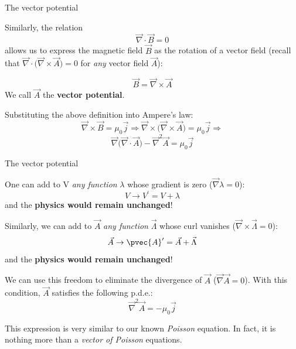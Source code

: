 %
%
%

\begin{frame}{The vector potential}

Similarly, the relation
\begin{equation*}
      \vec{\nabla} \cdot \vec{B} = 0
\end{equation*}
allows us to express the magnetic field $\vec{B}$ as the rotation of a
vector field (recall that $\vec{\nabla} \cdot \Big( \vec{\nabla} \times \vec{A} \Big) =0$
for {\em any} vector field $\vec{A}$):

\begin{equation*}
      \vec{B} = \vec{\nabla} \times \vec{A}
\end{equation*}
We call $\vec{A}$ the {\bf vector potential}.

\vspace{0.2cm}

Substituting the above definition into Ampere's law:
\begin{equation*}
     \vec{\nabla} \times \vec{B} = \mu_{0} \vec{j} \Rightarrow
     \vec{\nabla} \times \Big( \vec{\nabla} \times \vec{A}  \Big) =  \mu_{0} \vec{j} \Rightarrow
\end{equation*}
\begin{equation*}
     \vec{\nabla} \Big( \vec{\nabla} \cdot \vec{A}  \Big) - \vec{\nabla}^2 \vec{A}   =  \mu_{0} \vec{j}
\end{equation*}

\end{frame}

%
%
%

\begin{frame}{The vector potential}

One can add to V {\em any function} $\lambda$ whose gradient is zero ($\vec{\nabla} \lambda = 0$):
\begin{equation*}
   V \rightarrow V^{\prime} = V + \lambda
\end{equation*}
and the {\bf physics would remain unchanged}!\\
\vspace{0.1cm}

Similarly, we can add to $\vec{A}$  {\em any function} $\vec{\Lambda}$
whose curl vanishes ($\vec{\nabla} \times \vec{\Lambda} = 0$):
\begin{equation*}
   \vec{A} \rightarrow \pvec{A}' = \vec{A} + \vec{\Lambda}
\end{equation*}
and the {\bf physics would remain unchanged}!\\
\vspace{0.1cm}

We can use this freedom to eliminate the divergence of $\vec{A}$ ($\vec{\nabla} \vec{A} = 0$).
With this condition, $\vec{A}$ satisfies the following p.d.e.:
\begin{equation*}
   \vec{\nabla}^2 \vec{A}   =  - \mu_{0} \vec{j}
\end{equation*}

This expression is very similar to our known {\em Poisson} equation.
In fact, it is nothing more than a {\em vector of Poisson} equations.

\end{frame}

